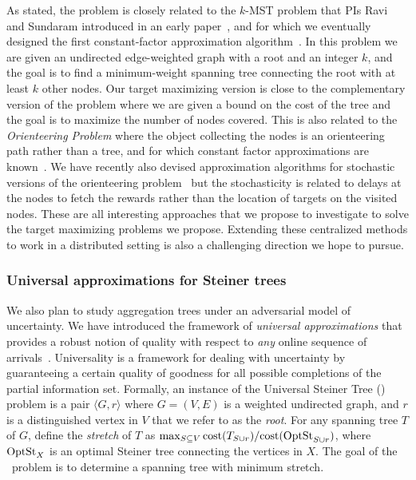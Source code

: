As stated, the problem is closely related to the $k$-MST problem that
PIs Ravi and Sundaram introduced in an early paper~\cite{RSMRR94}, and
for which we eventually designed the first constant-factor
approximation algorithm~\cite{BRV99}. In this problem we are given an
undirected edge-weighted graph with a root and an integer $k$, and the
goal is to find a minimum-weight spanning tree connecting the root
with at least $k$ other nodes. Our target maximizing version is close
to the complementary version of the problem where we are given a bound
on the cost of the tree and the goal is to maximize the number of
nodes covered. This is also related to the {\em Orienteering Problem}
where the object collecting the nodes is an orienteering path rather
than a tree, and for which constant factor approximations are
known~\cite{BCKLMM03}. We have recently also devised approximation
algorithms for stochastic versions of the orienteering
problem~\cite{GKNR12} but the stochasticity is related to delays at
the nodes to fetch the rewards rather than the location of targets on
the visited nodes. These are all interesting approaches that we
propose to investigate to solve the target maximizing problems we
propose. Extending these centralized methods to work in a distributed
setting is also a challenging direction we hope to pursue.

\iffalse
RELATED WORK: karger-minkoff maybecast tree, gupta-nagarajan-ravi
paper on adaptive TSP (icalp 10), and on stochastic vrp (OR, 2012) and
refs in this for previous papers on TSP with independent demands on
nodes (Bertsimas cycle heuristic). Also the basic expected target max
is like orienteering with size bound on tree, and hence related to
k-MST. Also related to garg-gupta-leonardi-sankowsi (SODA 08) which
relates to Univ TSP.
\fi

\subsubsection{Universal approximations for Steiner trees}
We also plan to study aggregation trees under an adversarial model of
uncertainty.  We have introduced the framework of {\em universal
  approximations}\/ that provides a robust notion of quality with
respect to {\em any} online sequence of
arrivals~\cite{jia+lnrs:universal}.  Universality is a framework for
dealing with uncertainty by guaranteeing a certain quality of goodness
for all possible completions of the partial information set.
Formally, an instance of the Universal Steiner Tree (\ust) problem is
a pair $\langle G , r\rangle$ where $G = (V,E)$ is a weighted
undirected graph, and $r$ is a distinguished vertex in $V$ that we
refer to as the {\em root}.  For any spanning tree $T$ of $G$, define
the {\em stretch}\/ of $T$ as $\max_{S \subseteq V}\mbox{cost}(T_{S\cup
    r})/\mbox{cost}(\mbox{OptSt}_{S\cup r})$, where $\mbox{OptSt}_{X}$ is an optimal
Steiner tree connecting the vertices in $X$.  The goal of the
\ust\ problem is to determine a spanning tree with minimum stretch.

